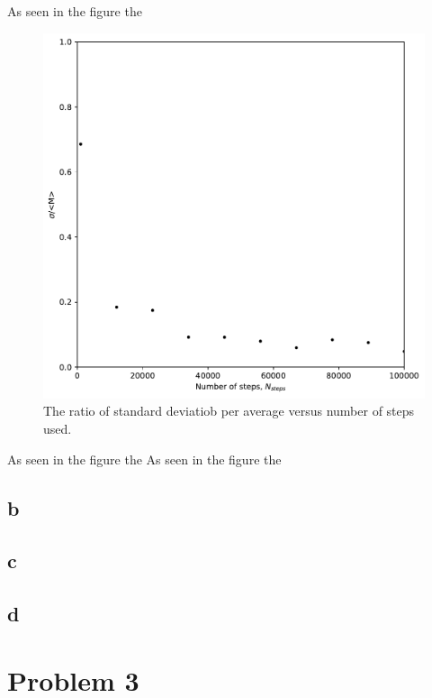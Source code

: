 \documentclass[a4paper]{article}
\theoremstyle{definition}
\begin{document}
As seen in the figure the
\begin{figure}[H]
\centering
\includegraphics[width = 10 cm]{Comp_set_1/Confined_Lattice.pdf}
\caption{The ratio of standard deviatiob per average versus number of steps used.
}
\label{fig:confined_lattice}
\end{figure}  
As seen in the figure the
As seen in the figure the
\subsection{b}
\subsection{c}
\subsection{d}
\section{Problem 3}
\end{document}
